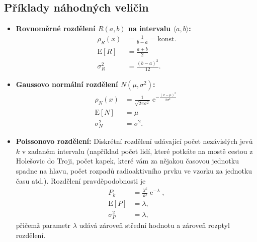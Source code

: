\documentclass[a4paper,11pt,twoside]{article}
\DeclareMathOperator{\e}{e}
\def\expectation#1{\mathrm{E}\left[#1\right]}
\def\dispersion#1{\sigma_{#1}^{2}}
\theoremstyle{red}
\theoremstyle{green}
\begin{document}
    \subsection{Příklady náhodných veličin}
        \begin{itemize}
            \item {\bf Rovnoměrné rozdělení $R(a,b)$ na intervalu $\langle a,b\rangle$:}
                \begin{align}
                    \label{eq:UniformDistribution}
                    \rho_{R}(x)&=\frac{1}{b-a}=\text{konst.}\\
                    \label{eq:ExpectationR}
                    \expectation{R}&=\frac{a+b}{2}\\
                    \label{eq:DispersionR}
                    \dispersion{R}&=\frac{(b-a)^{2}}{12}.
                \end{align} 

            \item {\bf Gaussovo normální rozdělení $N\left(\mu,\sigma^{2}\right)$:}
                \begin{align}
                    \label{eq:NormalDistribution}
                    \rho_{N}(x)&=\frac{1}{\sqrt{2\pi\sigma^{2}}}\e^{-\frac{(x-\mu)^{2}}{2\sigma^{2}}}\\
                    \expectation{N}&=\mu\\
                    \dispersion{N}&=\sigma^{2}.
                \end{align} 

            \item {\bf Poissonovo rozdělení:}
                Diskrétní rozdělení udávající počet nezávislých jevů $k$ v zadaném intervalu (například počet lidí, které potkáte na mostě cestou z Holešovic do Troji, počet kapek, které vám za nějakou časovou jednotku spadne na hlavu, počet rozpadů radioaktivního prvku ve vzorku za jednotku času atd.).  
                Rozdělení pravděpodobnosti je
                \begin{align}
                    \label{eq:Poisson}
                    P_{k}&=\frac{\lambda^{k}}{k!}\e^{-\lambda},\\
                    \label{eq:ExpectationP}
                    \expectation{P}&=\lambda,\\
                    \label{eq:DispersionP}
                    \dispersion{P}&=\lambda,
                \end{align}
                přičemž parametr $\lambda$ udává zároveň střední hodnotu a zároveň rozptyl rozdělení.
        \end{itemize}
\end{document}
